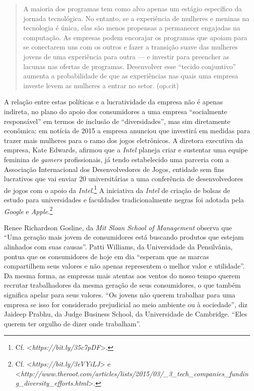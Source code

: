 \begin{quote}
A maioria dos programas tem como alvo apenas um estágio específico da
jornada tecnológica. No entanto, se a experiência de mulheres e meninas
na tecnologia é única, elas são menos propensas a permanecer engajadas
na computação. As empresas podem encorajar os programas que apoiam para
se conectarem uns com os outros e fazer a transição suave das mulheres
jovens de uma experiência para outra --- e investir para preencher as
lacunas nas ofertas de programas. Desenvolver esse ``tecido conjuntivo''
aumenta a probabilidade de que as experiências nas quais uma empresa
investe levem as mulheres a entrar no setor. (op.cit)
\end{quote}

A relação entre estas políticas e a lucratividade da empresa não é
apenas indireta, no plano do apoio dos consumidores a uma empresa
``socialmente responsável'' em termos de inclusão de ``diversidades'',
mas sim diretamente econômica: em notícia de 2015 a empresa anunciou que
investirá em medidas para trazer mais mulheres para o ramo dos jogos
eletrônicos. A diretora executiva da empresa, Kate Edwards, afirmou que
a \emph{Intel} planeja criar e sustentar uma equipe feminina de
\emph{gamers} profissionais, já tendo estabelecido uma parceria com a
Associação Internacional dos Desenvolvedores de Jogos, entidade sem fins
lucrativos que vai enviar 20 universitárias a uma conferência de
desenvolvedores de jogos com o apoio da \emph{Intel}.\footnote{Cf.
  \textless{}\emph{https://bit.ly/35c7pDF}\textgreater{}.}
A iniciativa da \emph{Intel} de criação de bolsas de estudo para
universidades e faculdades tradicionalmente negras foi adotada pela
\emph{Google} e \emph{Apple}.\footnote{Cf.
  \textless{}\emph{https://bit.ly/3eVYiLJ}\textgreater{}
  e \textless{}\emph{http://www.theroot.com/articles/lists/2015/03/\_3\_tech\_companies\_funding\_diversity\_efforts.html}\textgreater{}.}

Renee Richardson Gosline, da \emph{Mit Sloan School of Management}
observa que ``Uma geração mais jovem de consumidores está buscando
produtos que estejam alinhados com suas causas''. Patti Williams, da
Universidade da Pensilvânia, pontua que os consumidores de hoje em dia
``esperam que as marcas compartilhem seus valores e não apenas
representem o melhor valor e utilidade''. Da mesma forma, as empresas
mais atentas aos ventos do nosso tempo querem recrutar trabalhadores da
mesma geração de seus consumidores, o que também significa apelar para
seus valores. ``Os jovens não querem trabalhar para uma empresa se isso
for considerado prejudicial ao meio ambiente ou à sociedade'', diz
Jaideep Prabhu, da Judge Business School, da Universidade de Cambridge.
``Eles querem ter orgulho de dizer onde trabalham''.

